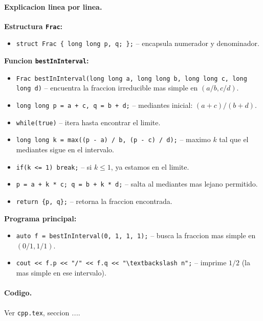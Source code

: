 \paragraph{Explicacion linea por linea.}
\textbf{Estructura \texttt{Frac}:}
\begin{itemize}\setlength\itemsep{0pt}
	\item \verb|struct Frac { long long p, q; };| -- encapsula numerador y denominador.
\end{itemize}
\textbf{Funcion \texttt{bestInInterval}:}
\begin{itemize}\setlength\itemsep{0pt}
	\item \verb|Frac bestInInterval(long long a, long long b, long long c, long long d)| -- encuentra la fraccion irreducible mas simple en $(a/b, c/d)$.
	\item \verb|long long p = a + c, q = b + d;| -- mediantes inicial: $(a+c)/(b+d)$.
	\item \verb|while(true)| -- itera hasta encontrar el limite.
	\item \verb|long long k = max((p - a) / b, (p - c) / d);| -- maximo $k$ tal que el mediantes sigue en el intervalo.
	\item \verb|if(k <= 1) break;| -- si $k \le 1$, ya estamos en el limite.
	\item \verb|p = a + k * c; q = b + k * d;| -- salta al mediantes mas lejano permitido.
	\item \verb|return {p, q};| -- retorna la fraccion encontrada.
\end{itemize}
\textbf{Programa principal:}
\begin{itemize}\setlength\itemsep{0pt}
	\item \verb|auto f = bestInInterval(0, 1, 1, 1);| -- busca la fraccion mas simple en $(0/1, 1/1)$.
	\item \verb|cout << f.p << "/" << f.q << "\textbackslash n";| -- imprime $1/2$ (la mas simple en ese intervalo).
\end{itemize}

\paragraph{Codigo.}
Ver \texttt{cpp.tex}, seccion \textit{...}.
